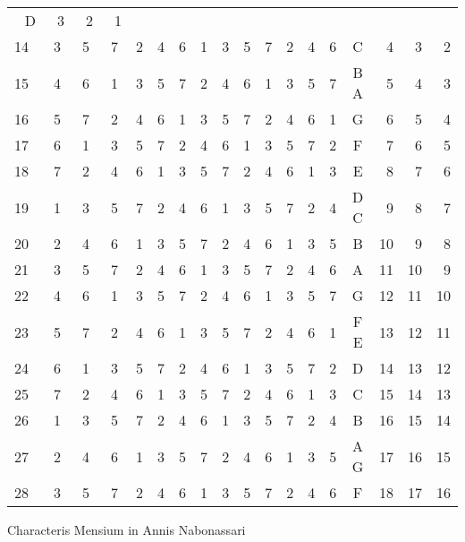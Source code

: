 \begin{tabnums}
\begin{tabular}[c]{@{} r  c c c c c c c c c c c c c  c c c c @{}}
 D  & ~3 & ~2 & ~1 \\
%
14~ &
3 & 5 & 7 & 2 & 4 & 6 & 1 & 3 & 5 & 7 & 2 & 4 & 6 &
 C  & ~4 & ~3 & ~2 \\
%
15~ &
4 & 6 & 1 & 3 & 5 & 7 & 2 & 4 & 6 & 1 & 3 & 5 & 7 &
B A & ~5 & ~4 & ~3 \\
%
16~ &
5 & 7 & 2 & 4 & 6 & 1 & 3 & 5 & 7 & 2 & 4 & 6 & 1 &
 G  & ~6 & ~5 & ~4 \\
%
17~ &
6 & 1 & 3 & 5 & 7 & 2 & 4 & 6 & 1 & 3 & 5 & 7 & 2 &
 F  & ~7 & ~6 & ~5 \\
%
18~ &
7 & 2 & 4 & 6 & 1 & 3 & 5 & 7 & 2 & 4 & 6 & 1 & 3 &
 E  & ~8 & ~7 & ~6 \\
%
19~ &
1 & 3 & 5 & 7 & 2 & 4 & 6 & 1 & 3 & 5 & 7 & 2 & 4 &
D C & ~9 & ~8 & ~7 \\
%
20~ &
2 & 4 & 6 & 1 & 3 & 5 & 7 & 2 & 4 & 6 & 1 & 3 & 5 &
 B  & 10 & ~9 & ~8 \\
%
21~ &
3 & 5 & 7 & 2 & 4 & 6 & 1 & 3 & 5 & 7 & 2 & 4 & 6 &
 A  & 11 & 10 & ~9 \\
%
22~ &
4 & 6 & 1 & 3 & 5 & 7 & 2 & 4 & 6 & 1 & 3 & 5 & 7 &
 G  & 12 & 11 & 10 \\
%
23~ &
5 & 7 & 2 & 4 & 6 & 1 & 3 & 5 & 7 & 2 & 4 & 6 & 1 &
F E & 13 & 12 & 11 \\
%
24~ &
6 & 1 & 3 & 5 & 7 & 2 & 4 & 6 & 1 & 3 & 5 & 7 & 2 &
 D  & 14 & 13 & 12 \\
%
25~ &
7 & 2 & 4 & 6 & 1 & 3 & 5 & 7 & 2 & 4 & 6 & 1 & 3 &
 C  & 15 & 14 & 13 \\
%
26~ &
1 & 3 & 5 & 7 & 2 & 4 & 6 & 1 & 3 & 5 & 7 & 2 & 4 &
 B  & 16 & 15 & 14 \\
%
27~ &
2 & 4 & 6 & 1 & 3 & 5 & 7 & 2 & 4 & 6 & 1 & 3 & 5 &
A G & 17 & 16 & 15 \\
%
28~ &
3 & 5 & 7 & 2 & 4 & 6 & 1 & 3 & 5 & 7 & 2 & 4 & 6 &
 F  & 18 & 17 & 16 \\
%
\end{tabular}
%
\caption{Characteris Mensium in Annis Nabonassari}
\label{tab:p200}
%
\end{tabnums}

